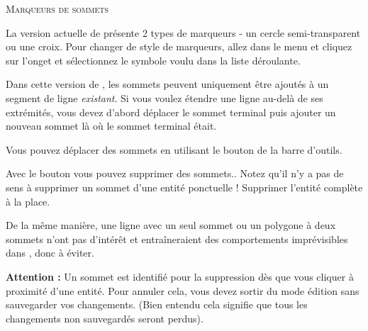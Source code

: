 \begin{Tip}[ht]\caption{\textsc{Marqueurs de sommets}}
La version actuelle de \qg présente 2 types de marqueurs - un cercle semi-transparent ou une croix. Pour changer de style de marqueurs, allez dans le menu  et cliquez sur l'onget  et sélectionnez le symbole voulu dans la liste déroulante.
\end{Tip}

Dans cette version de \qg, les sommets peuvent uniquement être ajoutés à un segment de ligne \textit{existant}. Si vous voulez étendre une ligne au-delà de ses extrémités, vous devez d'abord déplacer le sommet terminal puis ajouter un nouveau sommet là où le sommet terminal était.

Vous pouvez déplacer des sommets en utilisant le bouton  de la barre d'outils.


Avec le bouton  vous pouvez supprimer des sommets.. Notez qu'il n'y a pas de sens à supprimer un sommet d'une entité ponctuelle ! Supprimer l'entité complète à la place.

De la même manière, une ligne avec un seul sommet ou un polygone à deux sommets n'ont pas d'intérêt et entraîneraient des comportements imprévisibles dans \qg, donc à éviter. 

\textbf{Attention :} Un sommet est identifié pour la suppression dès que vous cliquer à proximité d'une entité. Pour annuler cela, vous devez sortir du mode édition sans sauvegarder vos changements. (Bien entendu cela signifie que tous les changements non sauvegardés seront perdus).

